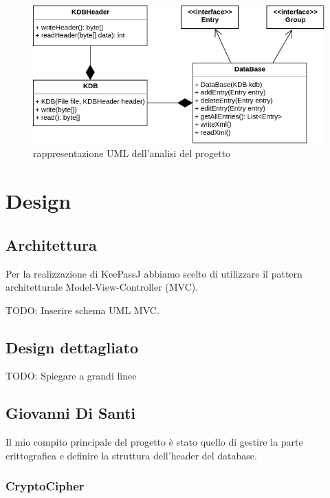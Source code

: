 \documentclass[a4paper,12pt]{report}
\begin{document}
\begin{figure}[h]
\centering{}
\includegraphics[width=\textwidth]{analysis}
\caption{rappresentazione UML dell'analisi del progetto}
\end{figure}

\chapter{Design}

\section{Architettura}

Per la realizzazione di KeePassJ abbiamo scelto di utilizzare il pattern architetturale
Model-View-Controller (MVC).

TODO: Inserire schema UML MVC.

\section{Design dettagliato}

TODO: Spiegare a grandi linee

\section*{Giovanni Di Santi}

Il mio compito principale del progetto è stato quello di gestire la parte crittografica e
definire la struttura dell'header del database.

\subsection*{CryptoCipher}
\end{document}
